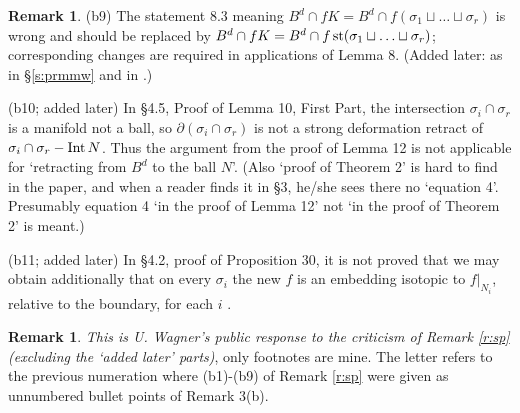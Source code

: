 \documentclass[12pt]{article}
\def\st{\mathop{\fam0 st}}
\def\Int{\mathop{\fam0 Int}}
\theoremstyle{plain}
\theoremstyle{definition}
\newtheorem{Remark}[Theorem]{Remark}
\begin{document}
{\begin{Remark}
(b9) The statement 8.3 meaning $B^d\cap fK=B^d\cap f(\sigma_1\sqcup\ldots\sqcup\sigma_r)$ is wrong and
should be replaced by $B^d\cap fK=B^d\cap f\st(\sigma_1\sqcup\ldots\sqcup\sigma_r)$; corresponding changes are required in applications of Lemma 8.
(Added later: as in \S\ref{s:prmmw} and in \cite[p. 327, (d)]{Sk06}.)



(b10; added later) In \S4.5, Proof of Lemma 10, First Part, the intersection $\sigma_i\cap\sigma_r$ is a manifold not a ball, so $\partial(\sigma_i\cap\sigma_r)$ is not a strong deformation retract of $\sigma_i\cap\sigma_r-\Int N$.
Thus the argument from the proof of Lemma 12 is not applicable for `retracting from $B^d$ to the ball $N$'.
(Also `proof of Theorem 2' is hard to find in the paper, and when a reader finds it in \S3, he/she sees there no `equation 4'. Presumably equation 4 `in the proof of Lemma 12' not `in the proof of Theorem 2' is meant.)

(b11; added later) In \S4.2, proof of Proposition 30, it is not proved that we may obtain additionally that on every $\sigma_i$ the new $f$  is an embedding isotopic to $f|_{N_i}$, relative to the boundary, for each $i$
\cite[proofs of Propositions 8.4 and 8.5, a generalization of the Whitney trick]{Sk06}.
\end{Remark}


\begin{Remark}\label{r:uw} {\it This is U. Wagner's public response to the criticism of Remark \ref{r:sp} (excluding the `added later' parts)}, only footnotes are mine.
The letter refers to the previous numeration \cite{Sk17o} where (b1)-(b9) of Remark \ref{r:sp} were given as unnumbered bullet points of Remark 3(b).


\end{Remark}}
\end{document}

